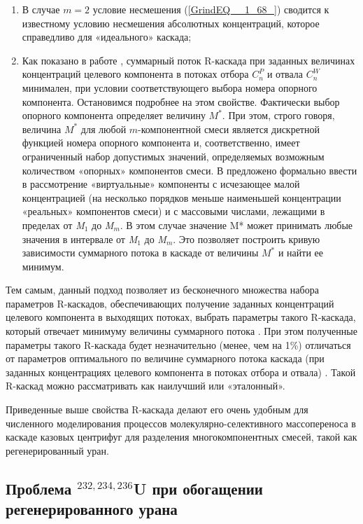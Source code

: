 \begin{enumerate}
  \item В случае $m=2$ условие несмешения (\ref{GrindEQ__1_68_}) сводится к известному условию несмешения абсолютных концентраций, которое справедливо для «идеального» каскада;
  \item	Как показано в работе \cite{songComparativeStudyModel2010}, суммарный поток R-каскада при заданных величинах концентраций целевого компонента в потоках отбора $C_{n}^{P}$ и отвала $C_{n}^{W}$ минимален, при условии соответствующего выбора номера опорного компонента. Остановимся подробнее на этом свойстве. Фактически выбор опорного компонента определяет величину $M^{*}$. При этом, строго говоря, величина $M^{*}$ для любой $m$-компонентной смеси является дискретной функцией номера опорного компонента и, соответственно, имеет ограниченный набор допустимых значений, определяемых возможным количеством «опорных» компонентов смеси. В \cite{sulaberidzeSravnenieOptimalnyhModelnyh2008} предложено формально ввести в рассмотрение «виртуальные» компоненты с исчезающее малой концентрацией (на несколько порядков меньше наименьшей концентрации «реальных» компонентов смеси) и с массовыми числами, лежащими в пределах от \textit{M${}_{1}$} до \textit{M${}_{m}$}. В этом случае значение M* может принимать любые значения в интервале от \textit{M${}_{1}$} до \textit{M${}_{m}$}. Это позволяет построить кривую зависимости суммарного потока в каскаде от величины $M^{*}$ и найти ее минимум. 
\end{enumerate}
  
Тем самым, данный подход позволяет из бесконечного множества набора параметров R-каскадов, обеспечивающих получение заданных концентраций целевого компонента в выходящих потоках, выбрать параметры такого R-каскада, который отвечает минимуму величины суммарного потока \cite{sulaberidzeSravnenieOptimalnyhModelnyh2008}. При этом полученные параметры такого R-каскада будет незначительно (менее, чем на 1\%) отличаться от параметров оптимального по величине суммарного потока каскада (при заданных концентрациях целевого компонента в потоках отбора и отвала) \cite{songComparativeStudyModel2010}. Такой R-каскад можно рассматривать как наилучший или «эталонный».

Приведенные выше свойства R-каскада делают его очень удобным для численного моделирования процессов молекулярно-селективного массопереноса в каскаде казовых центрифуг для разделения многокомпонентных смесей, такой как регенерированный уран.

\subsection{Проблема $^{232,234,236}$U при обогащении регенерированного урана}

